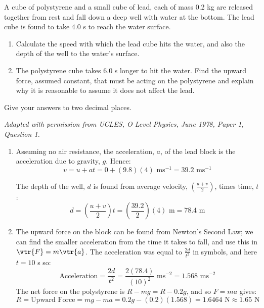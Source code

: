 
\begin{problem}[O1978PIIQ1a]
{A cube of polystyrene and a small cube of lead, each of mass 0.2 kg are released together from rest and fall down a deep well with water at the bottom. The lead cube is found to take 4.0 s to reach the water surface.
\begin{enumerate}
	\item Calculate the speed with which the lead cube hits the water, and also the depth of the well to the water's surface.  
	\item The polystyrene cube takes 6.0 s longer to hit the water. Find the upward force, assumed constant, that must be acting on the polystyrene and explain why it is reasonable to assume it does not affect the lead. 
\end{enumerate}
Give your answers to two decimal places.} 
{\textit{Adapted with permission from UCLES, O Level Physics, June 1978, Paper 1, Question 1.}}
{\begin{enumerate}
\item Assuming no air resistance, the acceleration, $a$, of the lead block is the acceleration due to gravity, $g$. Hence:
\begin{equation*}v = u + at = 0 + (9.8)(4) \textrm{ ms}^{-1} = 39.2 \textrm{ ms}^{-1} \end{equation*}

The depth of the well, $d$ is found from average velocity, $\left(\frac{u + v}{2}\right)$, times time, $t$:
\begin{equation*} d = \left(\frac{u + v}{2}\right)t = \left(\frac{39.2}{2}\right)(4) \textrm{ m} = 78.4 \textrm{ m} \end{equation*}
\item The upward force on the block can be found from Newton's Second Law; we can find the smaller acceleration from the time it takes to fall, and use this in $\vtr{F} = m\vtr{a}$. The acceleration was equal to $\frac{2d}{t^{2}}$ in symbols, and here $t = 10$ s so:
\begin{equation*} \textrm{Acceleration} = \frac{2d}{t^{2}} = \frac{2(78.4)}{(10)^{2}} \textrm{ ms}^{-2} = 1.568 \textrm{ ms}^{-2} \end{equation*}
The net force on the polystyrene is $R - mg = R - 0.2g$, and so $F = ma$ gives:
\begin{equation*} R = \textrm{Upward Force} = mg - ma = 0.2g - (0.2)(1.568) = 1.6464 \textrm{ N} \approx 1.65 \textrm{ N} \end{equation*}


\end{enumerate}}
\end{problem}
